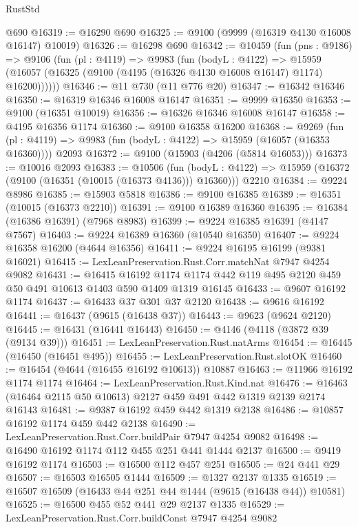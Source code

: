 \begin{lexlean}{RustStd}
\begin{coremodule}
    @690
@16319 := @16290 @690
@16325 := @9100 (@9999 (@16319 @4130 @16008 @16147) @10019)
@16326 := @16298 @690
@16342 := @10459
    (fun (pns : @9186) =>
    @9106
      (fun (pl : @4119) =>
      @9983
        (fun (bodyL : @4122) =>
        @15959 (@16057 (@16325 (@9100 (@4195 (@16326 @4130 @16008 @16147) @1174) @16200))))))
@16346 := @11 @730 (@11 @776 @20)
@16347 := @16342 @16346
@16350 := @16319 @16346 @16008 @16147
@16351 := @9999 @16350
@16353 := @9100 (@16351 @10019)
@16356 := @16326 @16346 @16008 @16147
@16358 := @4195 @16356 @1174
@16360 := @9100 @16358 @16200
@16368 := @9269
    (fun (pl : @4119) => @9983 (fun (bodyL : @4122) => @15959 (@16057 (@16353 @16360))))
    @2093
@16372 := @9100 (@15903 (@4206 (@5814 @16053)))
@16373 := @10016 @2093
@16383 := @10506
    (fun (bodyL : @4122) => @15959 (@16372 (@9100 (@16351 (@10015 (@16373 @4136))) @16360)))
    @2210
@16384 := @9224 @8986
@16385 := @15903 @5818
@16386 := @9100 @16385
@16389 := @16351 (@10015 (@16373 @2210))
@16391 := @9100 @16389 @16360
@16395 := @16384 (@16386 @16391) (@7968 @8983)
@16399 := @9224 @16385 @16391 (@4147 @7567)
@16403 := @9224 @16389 @16360 (@10540 @16350)
@16407 := @9224 @16358 @16200 (@4644 @16356)
@16411 := @9224 @16195 @16199 (@9381 @16021)
@16415 := LexLeanPreservation.Rust.Corr.matchNat @7947 @4254 @9082
@16431 := @16415
    @16192
    @1174
    @1174
    @442
    @119
    @495
    @2120
    @459
    @50
    @491
    @10613
    @1403
    @590
    @1409
    @1319
    @16145
@16433 := @9607 @16192 @1174
@16437 := @16433 @37 @301 @37 @2120
@16438 := @9616 @16192
@16441 := @16437 (@9615 (@16438 @37))
@16443 := @9623 (@9624 @2120)
@16445 := @16431 (@16441 @16443)
@16450 := @4146 (@4118 (@3872 @39 (@9134 @39)))
@16451 := LexLeanPreservation.Rust.natArms
@16454 := @16445 (@16450 (@16451 @495))
@16455 := LexLeanPreservation.Rust.slotOK
@16460 := @16454 (@4644 (@16455 @16192 @10613)) @10887
@16463 := @11966 @16192 @1174 @1174
@16464 := LexLeanPreservation.Rust.Kind.nat
@16476 := @16463 (@16464 @2115 @50 @10613) @2127 @459 @491 @442 @1319 @2139 @2174 @16143
@16481 := @9387 @16192 @459 @442 @1319 @2138
@16486 := @10857 @16192 @1174 @459 @442 @2138
@16490 := LexLeanPreservation.Rust.Corr.buildPair @7947 @4254 @9082
@16498 := @16490 @16192 @1174 @112 @455 @251 @441 @1444 @2137
@16500 := @9419 @16192 @1174
@16503 := @16500 @112 @457 @251
@16505 := @24 @441 @29
@16507 := @16503 @16505 @1444
@16509 := @1327 @2137 @1335
@16519 := @16507 @16509 (@16433 @44 @251 @44 @1444 (@9615 (@16438 @44)) @10581)
@16525 := @16500 @455 @52 @441 @29 @2137 @1335
@16529 := LexLeanPreservation.Rust.Corr.buildConst @7947 @4254 @9082

\end{coremodule}
\end{lexlean}
